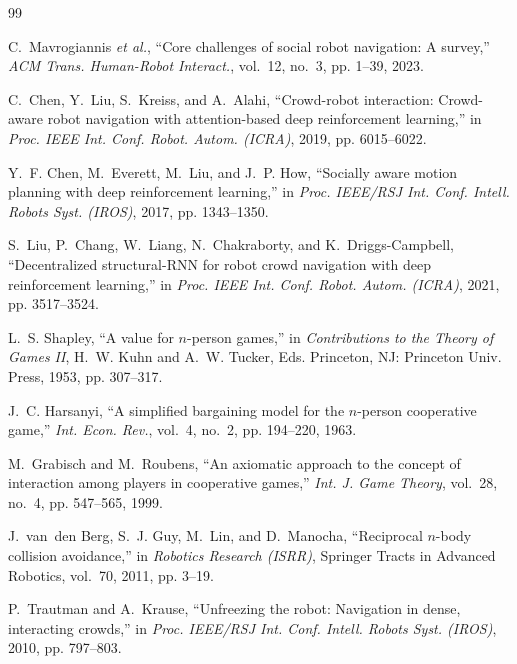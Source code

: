 \documentclass[conference]{IEEEtran}
\begin{document}
\balance
\begin{thebibliography}{99}

C.~Mavrogiannis \emph{et al.}, ``Core challenges of social robot navigation: A
survey,'' \emph{ACM Trans. Human-Robot Interact.}, vol.~12, no.~3,
pp. 1--39, 2023.

C.~Chen, Y.~Liu, S.~Kreiss, and A.~Alahi, ``Crowd-robot interaction: Crowd-aware
robot navigation with attention-based deep reinforcement learning,'' in
\emph{Proc. IEEE Int. Conf. Robot. Autom. (ICRA)}, 2019, pp.
6015--6022.

Y.~F. Chen, M.~Everett, M.~Liu, and J.~P. How, ``Socially aware motion planning
with deep reinforcement learning,'' in \emph{Proc. IEEE/RSJ Int. Conf. Intell. Robots Syst. (IROS)}, 2017, pp. 1343--1350.

S.~Liu, P.~Chang, W.~Liang, N.~Chakraborty, and K.~Driggs-Campbell,
``Decentralized structural-RNN for robot crowd navigation with deep reinforcement
learning,'' in \emph{Proc. IEEE Int. Conf. Robot. Autom. (ICRA)}, 2021,
pp. 3517--3524.

L.~S. Shapley, ``A value for $n$-person games,'' in \emph{Contributions to the
Theory of Games II}, H.~W. Kuhn and A.~W. Tucker, Eds. Princeton, NJ: Princeton
Univ. Press, 1953, pp. 307--317.

J.~C. Harsanyi, ``A simplified bargaining model for the $n$-person cooperative
game,'' \emph{Int. Econ. Rev.}, vol.~4, no.~2, pp. 194--220, 1963.

M.~Grabisch and M.~Roubens, ``An axiomatic approach to the concept of interaction
among players in cooperative games,'' \emph{Int. J. Game Theory}, vol.~28, no.~4, pp. 547--565, 1999.

J.~van~den Berg, S.~J. Guy, M.~Lin, and D.~Manocha, ``Reciprocal $n$-body
collision avoidance,'' in \emph{Robotics Research (ISRR)}, Springer Tracts in Advanced Robotics, vol.~70, 2011, pp. 3--19.

P.~Trautman and A.~Krause, ``Unfreezing the robot: Navigation in dense,
interacting crowds,'' in \emph{Proc. IEEE/RSJ Int. Conf. Intell. Robots Syst. (IROS)}, 2010, pp. 797--803.


\end{thebibliography}
\end{document}
